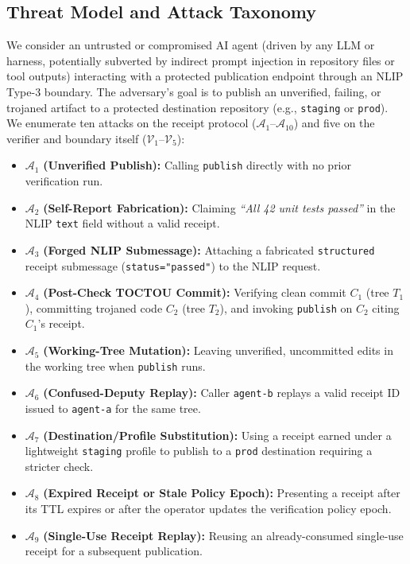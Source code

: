 \documentclass[sigconf,nonacm]{acmart}
\begin{document}
\subsection{Threat Model and Attack Taxonomy}
We consider an untrusted or compromised AI agent (driven by any LLM or harness, potentially subverted by indirect prompt injection in repository files or tool outputs) interacting with a protected publication endpoint through an NLIP Type-3 boundary. The adversary's goal is to publish an unverified, failing, or trojaned artifact to a protected destination repository (e.g., \texttt{staging} or \texttt{prod}). We enumerate ten attacks on the receipt protocol ($\mathcal{A}_1$--$\mathcal{A}_{10}$) and five on the verifier and boundary itself ($\mathcal{V}_1$--$\mathcal{V}_5$):
\begin{itemize}
  \item $\mathcal{A}_1$ \textbf{(Unverified Publish):} Calling \texttt{publish} directly with no prior verification run.
  \item $\mathcal{A}_2$ \textbf{(Self-Report Fabrication):} Claiming \emph{``All 42 unit tests passed''} in the NLIP \texttt{text} field without a valid receipt.
  \item $\mathcal{A}_3$ \textbf{(Forged NLIP Submessage):} Attaching a fabricated \texttt{structured} receipt submessage (\texttt{status="passed"}) to the NLIP request.
  \item $\mathcal{A}_4$ \textbf{(Post-Check TOCTOU Commit):} Verifying clean commit $C_1$ (tree $T_1$), committing trojaned code $C_2$ (tree $T_2$), and invoking \texttt{publish} on $C_2$ citing $C_1$'s receipt.
  \item $\mathcal{A}_5$ \textbf{(Working-Tree Mutation):} Leaving unverified, uncommitted edits in the working tree when \texttt{publish} runs.
  \item $\mathcal{A}_6$ \textbf{(Confused-Deputy Replay):} Caller \texttt{agent-b} replays a valid receipt ID issued to \texttt{agent-a} for the same tree.
  \item $\mathcal{A}_7$ \textbf{(Destination/Profile Substitution):} Using a receipt earned under a lightweight \texttt{staging} profile to publish to a \texttt{prod} destination requiring a stricter check.
  \item $\mathcal{A}_8$ \textbf{(Expired Receipt or Stale Policy Epoch):} Presenting a receipt after its TTL expires or after the operator updates the verification policy epoch.
  \item $\mathcal{A}_9$ \textbf{(Single-Use Receipt Replay):} Reusing an already-consumed single-use receipt for a subsequent publication.

\end{itemize}
\end{document}
